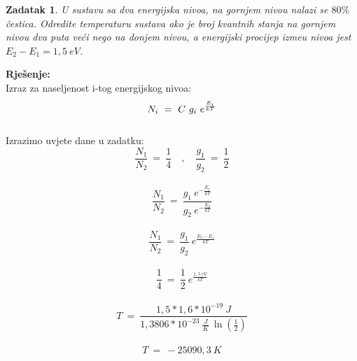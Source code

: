 \documentclass[a4paper,12pt]{article}
\newtheorem{ZDK}{Zadatak}[section]
\begin{document}
\newpage
\begin{ZDK}
	U sustavu sa dva energijska nivoa, na gornjem nivou nalazi se $80\%$ \v{c}estica.
	Odredite temperaturu sustava ako je broj kvantnih stanja na gornjem nivou dva puta ve\'{c}i nego na donjem nivou, 
	a energijski procijep izme\dj u nivoa jest $E_2-E_1=1,5\ eV$.
\end{ZDK}
\textbf{Rje\v{s}enje:} \\
\newline
Izraz za naseljenost i-tog energijskog nivoa:
$$ N_i\ =\ C\ g_i\ e^{\-\frac{E_i}{kT}} $$
\\
Izrazimo uvjete dane u zadatku:
$$ \frac{N_1}{N_2}\ =\ \frac{1}{4} \quad , \quad \frac{g_1}{g_2}\ =\ \frac{1}{2} $$
\\
$$ \frac{N_1}{N_2}\ =\ \frac{g_1\ e^{- \frac{E_1}{kT}}}{g_2\ e^{- \frac{E_2}{kT}}} $$
\\
$$ \frac{N_1}{N_2}\ =\ \frac{g_1}{g_2}\ e^{\frac{E_2-E_1}{kT}} $$
\\
$$ \frac{1}{4}\ =\ \frac{1}{2}\ e^{\frac{1,5\ eV}{kT}} $$
\\
$$ T\ =\ \frac{1,5*1,6*10^{-19}\ J}{1,3806*10^{-23}\ \frac{J}{K}\ \ln(\frac{1}{2})} $$
\\
$$ T\ =\ -25090,3\ K $$
\end{document}
